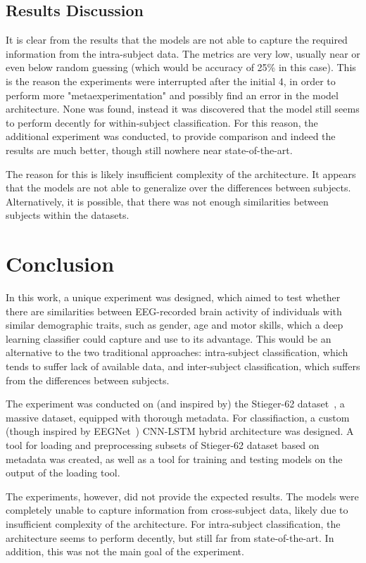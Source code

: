 \documentclass[english, he, bc, kiv, iso690alph, viewonly]{fasthesis}
\begin{document}
\section{Results Discussion}
\label{sec:disc}

It is clear from the results that the models are not able to capture the required information from the intra-subject data. The metrics are very low, usually near or even below random guessing (which would be accuracy of 25\% in this case). This is the reason the experiments were interrupted after the initial 4, in order to perform more "metaexperimentation" and possibly find an error in the model architecture. None was found, instead it was discovered that the model still seems to perform decently for within-subject classification. For this reason, the additional experiment was conducted, to provide comparison and indeed the results are much better, though still nowhere near state-of-the-art.

The reason for this is likely insufficient complexity of the architecture. It appears that the models are not able to generalize over the differences between subjects. Alternatively, it is possible, that there was not enough similarities between subjects within the datasets.

\chapter{Conclusion}

In this work, a unique experiment was designed, which aimed to test whether there are similarities between EEG-recorded brain activity of individuals with similar demographic traits, such as gender, age and motor skills, which a deep learning classifier could capture and use to its advantage. This would be an alternative to the two traditional approaches: intra-subject classification, which tends to suffer lack of available data, and inter-subject classification, which suffers from the differences between subjects.

The experiment was conducted on (and inspired by) the Stieger-62 dataset~\cite{data:stieger:21}, a massive dataset, equipped with thorough metadata. For classifiaction, a custom (though inspired by EEGNet~\cite{lawhern:eegnet:18}) CNN-LSTM hybrid architecture was designed. A tool for loading and preprocessing subsets of Stieger-62 dataset based on metadata was created, as well as a tool for training and testing models on the output of the loading tool.

The experiments, however, did not provide the expected results. The models were completely unable to capture information from cross-subject data, likely due to insufficient complexity of the architecture. For intra-subject classification, the architecture seems to perform decently, but still far from state-of-the-art. In addition, this was not the main goal of the experiment.
\end{document}
